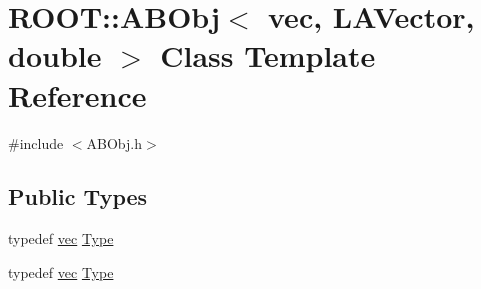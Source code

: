 \hypertarget{classROOT_1_1Minuit2_1_1ABObj_3_01vec_00_01LAVector_00_01double_01_4}{}\section{R\+O\+OT\+:\+:A\+B\+Obj$<$ vec, L\+A\+Vector, double $>$ Class Template Reference}
\label{classROOT_1_1Minuit2_1_1ABObj_3_01vec_00_01LAVector_00_01double_01_4}


{\ttfamily \#include $<$A\+B\+Obj.\+h$>$}

\subsection*{Public Types}
\begin{DoxyCompactItemize}
\item 
typedef \mbox{\hyperlink{classROOT_1_1Minuit2_1_1vec}{vec}} \mbox{\hyperlink{classROOT_1_1Minuit2_1_1ABObj_3_01vec_00_01LAVector_00_01double_01_4_a4b4f01cea6a833a82f65ddadd8cb0f40}{Type}}
\item 
typedef \mbox{\hyperlink{classROOT_1_1Minuit2_1_1vec}{vec}} \mbox{\hyperlink{classROOT_1_1Minuit2_1_1ABObj_3_01vec_00_01LAVector_00_01double_01_4_a4b4f01cea6a833a82f65ddadd8cb0f40}{Type}}
\end{DoxyCompactItemize}
